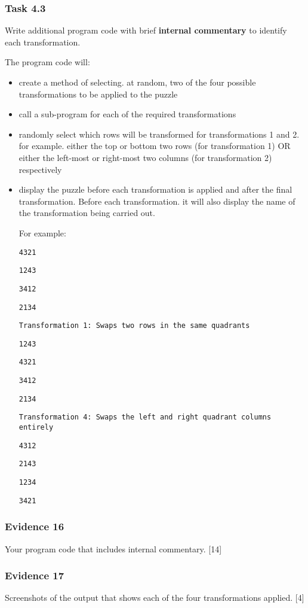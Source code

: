 \subsubsection*{Task 4.3}

Write additional program code with brief \textbf{internal commentary}
to identify each transformation. 

The program code will: 
\begin{itemize}
\item create a method of selecting. at random, two of the four possible
transformations to be applied to the puzzle 
\item call a sub-program for each of the required transformations 
\item randomly select which rows will be transformed for transformations
1 and 2. for example. either the top or bottom two rows (for transformation
1) OR either the left-most or right-most two columns (for transformation
2) respectively 
\item display the puzzle before each transformation is applied and after
the final transformation. Before each transformation. it will also
display the name of the transformation being carried out. 

For example: 

\texttt{4321 }

\texttt{1243 }

\texttt{3412 }

\texttt{2134 }

\texttt{Transformation 1: Swaps two rows in the same quadrants }

\texttt{1243 }

\texttt{4321 }

\texttt{3412 }

\texttt{2134 }

\texttt{Transformation 4: Swaps the left and right quadrant columns
entirely }

\texttt{4312 }

\texttt{2143 }

\texttt{1234 }

\texttt{3421 }
\end{itemize}

\subsubsection*{Evidence 16}

Your program code that includes internal commentary.\hfill{} {[}14{]}

\subsubsection*{Evidence 17}

Screenshots of the output that shows each of the four transformations
applied. \hfill{}{[}4{]}